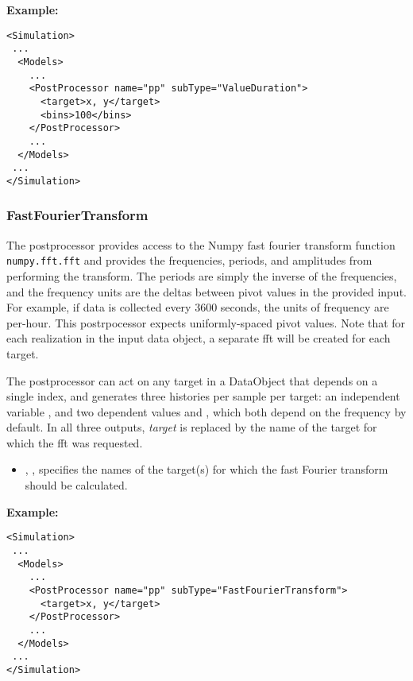 \textbf{Example:}

\begin{lstlisting}[style=XML]
<Simulation>
 ...
  <Models>
    ...
    <PostProcessor name="pp" subType="ValueDuration">
      <target>x, y</target>
      <bins>100</bins>
    </PostProcessor>
    ...
  </Models>
 ...
</Simulation>
\end{lstlisting}

\subsubsection{FastFourierTransform}
\label{FastFourierTransformPP}
The  postprocessor provides access to the Numpy fast fourier transform function
\texttt{numpy.fft.fft}
and provides the frequencies, periods, and amplitudes from performing the transform. The periods are simply
the inverse of the frequencies, and the frequency units are the deltas between pivot values in the provided
input. For example, if data is collected every 3600 seconds, the units of frequency are per-hour.  This
postrpocessor expects uniformly-spaced pivot values. Note that for each realization in the input data object,
a separate fft will be created for each target.

The  postprocessor can act on any target in a DataObject that depends on a
single index, and generates three histories per sample per target: an independent variable
, and two dependent values  and
, which both depend on the frequency by default. In all three outputs,
\emph{target} is replaced by the name of the target for which the fft was requested.

%
\begin{itemize}
  \item {}, , specifies the names of the
    target(s) for which the fast Fourier transform should be calculated.
 \end{itemize}   
\textbf{Example:}

\begin{lstlisting}[style=XML]
<Simulation>
 ...
  <Models>
    ...
    <PostProcessor name="pp" subType="FastFourierTransform">
      <target>x, y</target>
    </PostProcessor>
    ...
  </Models>
 ...
</Simulation>
\end{lstlisting}
